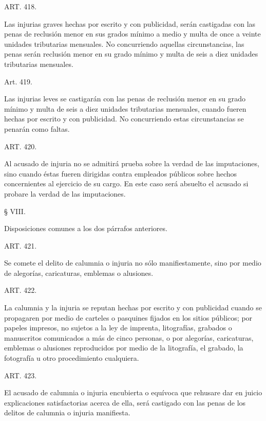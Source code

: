    ART. 418.

    Las injurias graves hechas por escrito y con publicidad, serán castigadas con las penas de reclusión menor en sus grados mínimo a medio y multa de once a veinte unidades tributarias mensuales.
    No concurriendo aquellas circunstancias, las penas serán reclusión menor en su grado mínimo y multa de seis a diez unidades tributarias mensuales.






    Art. 419.

    Las injurias leves se castigarán con las penas de reclusión menor en su grado mínimo y multa de seis a diez unidades tributarias mensuales, cuando fueren hechas por escrito y con publicidad. No concurriendo estas circunstancias se penarán como faltas.





    ART. 420.

    Al acusado de injuria no se admitirá prueba sobre la verdad de las imputaciones, sino cuando éstas fueren dirigidas contra empleados públicos sobre hechos concernientes al ejercicio de su cargo.
    En este caso será absuelto el acusado si probare la verdad de las imputaciones.



    § VIII.

    Disposiciones comunes a los dos párrafos anteriores.








    ART. 421.

    Se comete el delito de calumnia o injuria no sólo manifiestamente, sino por medio de alegorías, caricaturas, emblemas o alusiones.


    ART. 422.

    La calumnia y la injuria se reputan hechas por escrito y con publicidad cuando se propagaren por medio de carteles o pasquines fijados en los sitios públicos; por papeles impresos, no sujetos a la ley de imprenta, litografías, grabados o manuscritos comunicados a más de cinco personas, o por alegorías, caricaturas, emblemas o alusiones reproducidos por medio de la litografía, el grabado, la fotografía u otro procedimiento cualquiera.



    ART. 423.

    El acusado de calumnia o injuria encubierta o equívoca que rehusare dar en juicio explicaciones satisfactorias acerca de ella, será castigado con las penas de los delitos de calumnia o injuria manifiesta.

